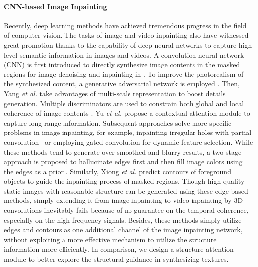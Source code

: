 \paragraph{CNN-based Image Inpainting}
Recently, deep learning methods have achieved tremendous progress in the field
of computer vision. The tasks of image and video inpainting also have witnessed great promotion thanks to the capability of deep neural networks to capture high-level semantic information in images and videos.
%
A convolution neural network (CNN) is first introduced to directly synthesize image contents in the masked regions for image denoising and inpainting in \cite{xie2012image}.
To improve the photorealism of the synthesized content, a generative adversarial network is employed \cite{pathak2016context}. 
Then, Yang \emph{et al.} \cite{yang2017high} take advantages of multi-scale representation to boost details generation.
Multiple discriminators are used to constrain both global and local coherence of image contents \cite{iizuka2017globally}.  
Yu \emph{et al.} \cite{yu2018generative} propose a contextual attention module to capture long-range information.
Subsequent approaches solve more specific problems in image inpainting, for example, inpainting irregular holes with partial convolution~\cite{liu2018partialinpainting} or employing gated convolution \cite{yu2018free} for dynamic feature selection. 
%
While these methods tend to generate over-smoothed and blurry results, a two-stage approach is proposed to hallucinate edges first and then fill image colors using the edges as a prior \cite{nazeri2019edgeconnect}. 
Similarly, Xiong \emph{et al.} \cite{Xiong_2019_CVPR} predict contours of foreground objects to guide the inpainting process of masked regions.
Though high-quality static images with reasonable structure can be generated using these edge-based methods, simply extending it from image inpainting to video inpainting by 3D convolutions inevitably fails because of no guarantee on the temporal coherence, especially on the high-frequency signals. 
Besides, these methods simply utilize edges and contours as one additional channel of the image inpainting network, without exploiting a more effective mechanism to utilize the structure information more efficiently. 
In comparison, we design a structure attention module to better explore the structural guidance in synthesizing textures. 


